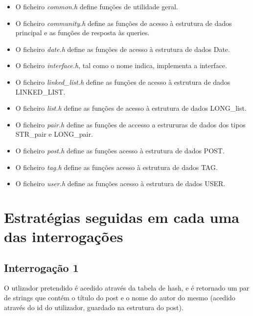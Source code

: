 \documentclass[10pt]{report}
\begin{document}
\begin{itemize}

\item O ficheiro \textit{common.h} define funções de utilidade geral.

\item O ficheiro \textit{community.h} define as funções de acesso à estrutura de dados principal e as funções de resposta às queries.

\item O ficheiro \textit{date.h} define as funções de acesso à estrutura de dados Date.

\item O ficheiro \textit{interface.h}, tal como o nome indica, implementa a interface.

\item O ficheiro \textit{linked\_list.h} define as funções de acesso à estrutura de dados LINKED\_LIST.

\item O ficheiro \textit{list.h} define as funções de acesso à estrutura de dados LONG\_list.

\item O ficheiro \textit{pair.h} define as funções de accesso a estrururas de dados dos tipos STR\_pair e LONG\_pair.

\item O ficheiro \textit{post.h} define as funções acesso à estrutura de dados POST.

\item O ficheiro \textit{tag.h} define as funções acesso à estrutura de dados TAG.

\item O ficheiro \textit{user.h} define as funções acesso à estrutura de dados USER.

\end{itemize}

\section{Estratégias seguidas em cada uma das interrogações}

\subsection{Interrogação 1}
O utlizador pretendido é acedido através da tabela de hash, e é retornado um par de strings que contém o título do post e o nome do autor do mesmo (acedido através do id do utilizador, guardado na estrutura do post).
\end{document}

